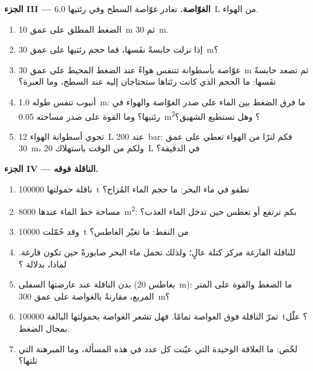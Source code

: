 \begin{problem}
\medskip
\noindent\textbf{الجزء III --- الغوّاصة.}
تغادر غوّاصة السطح وفي رئتيها \qty{6.0}{L} من الهواء.
\begin{enumerate}[resume]
  \item الضغط المطلق على عمق \qty{10}{m} ثم \qty{30}{m}.
  \item إذا نزلت حابسةً نفَسها، فما حجم رئتيها على عمق
        \qty{30}{m}؟
  \item غوّاصة بأسطوانة تتنفس هواءً عند الضغط المحيط على عمق
        \qty{30}{m} ثم تصعد حابسةً نفَسها: ما الحجم الذي كانت
        رئتاها ستحتاجان إليه عند السطح، وما العبرة؟
  \item أنبوب تنفس طوله \qty{1.0}{m}: ما فرق الضغط بين الماء على
        صدر الغوّاصة والهواء في رئتيها؟ وما القوة على صدر
        مساحته \qty{0.05}{m^2}؟ وهل تستطيع الشهيق؟
  \item تحوي أسطوانة الهواء \qty{12}{L} عند \qty{200}{bar}: فكم لترًا
        من الهواء تعطي على عمق \qty{30}{m}، ولكم من الوقت باستهلاك
        \qty{20}{L} في الدقيقة؟
\end{enumerate}

\medskip
\noindent\textbf{الجزء IV --- الناقلة فوقه.}
\begin{enumerate}[resume]
  \item ناقلة حمولتها \qty{100000}{t} تطفو في ماء البحر: ما حجم
        الماء المُزاح؟
  \item مساحة خط الماء عندها \qty{8000}{m^2}: بكم ترتفع أو تغطس
        حين تدخل الماء العذب؟
  \item وقد حُمّلت \qty{10000}{t} من النفط: ما تغيّر الغاطس؟
  \item للناقلة الفارغة مركز كتلة عالٍ؛ ولذلك تحمل ماء البحر
        صابورةً حين تكون فارغة. لماذا، بدلالة ؟
  \item بدن الناقلة عند عارضتها السفلى (بغاطس \qty{20}{m}): ما
        الضغط والقوة على المتر المربع، مقارنةً بالغواصة على عمق
        \qty{300}{m}؟
  \item تمرّ الناقلة فوق الغواصة تمامًا. فهل تشعر الغواصة
        بحمولتها البالغة \qty{100000}{t}؟ علّل بمجال الضغط.
  \item لخّص: ما العلاقة الوحيدة التي عيّنت كل عدد في هذه
        المسألة، وما المبرهنة التي تلتها؟
\end{enumerate}
\end{problem}
